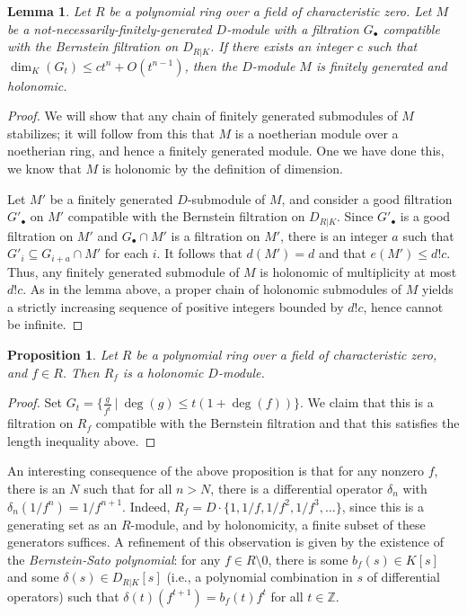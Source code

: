 \documentclass[11pt]{book}
\newtheorem{lemma}[theorem]{Lemma}
\newtheorem{proposition}[theorem]{Proposition}
\numberwithin{equation}{section}
\numberwithin{theorem}{chapter}
\theoremstyle{definition}
\newtheorem*{basic properties}{Basic Properties}
\newtheorem*{Important Remark}{Important Remark}
\theoremstyle{remark}
\newcommand{\ZZ}{\mathbb{Z}}
\renewcommand{\dim}{\operatorname{dim}}
\begin{document}
\begin{lemma} Let $R$ be a polynomial ring over a field of characteristic zero. Let $M$ be a not-necessarily-finitely-generated $D$-module with a filtration
$G_\bullet$ compatible with the Bernstein filtration on $D_{R|K}$.
If there exists an integer $c$ such that $\dim_K(G_t)\leq c t^n + O(t^{n-1})$, then the $D$-module $M$ is finitely generated and holonomic.
\end{lemma}
\begin{proof}
We will show that any chain of finitely generated submodules of $M$ stabilizes; it will follow from this that $M$ is a noetherian module over a noetherian ring, and hence a finitely generated module. One we have done this, we know that $M$ is holonomic by the definition of dimension.
	
Let $M'$ be a finitely generated $D$-submodule of $M$, and consider a good
filtration $G'_\bullet$ on $M'$ compatible with the Bernstein filtration on $D_{R|K}$. Since $G'_\bullet$ is a good filtration on $M'$ and $G_\bullet \cap M'$ is a filtration on $M'$,
there is an integer $a$ such that $G'_i \subseteq G_{i+a} \cap M'$ for each $i$. It follows that $d(M')=d$ and that $e(M') \leq d!c$. Thus, any finitely generated submodule
of $M$ is holonomic of multiplicity at most $d! c$. As in the lemma above, a proper chain of holonomic submodules of $M$ yields a strictly increasing sequence of positive integers bounded by $d! c$, hence cannot be infinite.
\end{proof}

\begin{proposition}
	Let $R$ be a polynomial ring over a field of characteristic zero, and $f\in R$. Then $R_f$ is a holonomic $D$-module.
\end{proposition}
\begin{proof}
	Set $G_t=\{ \frac{g}{f^t} \ | \ \deg(g)\leq t(1+ \deg(f)) \}$. We claim that this is a filtration on $R_f$ compatible with the Bernstein filtration and that this satisfies the length inequality above.
\end{proof}

An interesting consequence of the above proposition is that for any nonzero $f$, there is an $N$ such that for all $n>N$, there is a differential operator $\delta_n$ with $\delta_n(1/f^{n})=1/f^{n+1}$. Indeed, $R_f=D\cdot\{ 1, 1/f, 1/f^2,1/f^3,\dots\}$, since this is a generating set as an $R$-module, and by holonomicity, a finite subset of these generators suffices. A refinement of this observation is given by the existence of the \emph{Bernstein-Sato polynomial}: for any 
$f\in R\setminus 0$, there is some $b_f(s)\in K[s]$ and some $\delta(s)\in D_{R|K}[s]$ (i.e., a polynomial combination in $s$ of differential operators) such that $\delta(t)(f^{t+1})=b_f(t) f^t$ for all $t\in \ZZ$.
\end{document}
